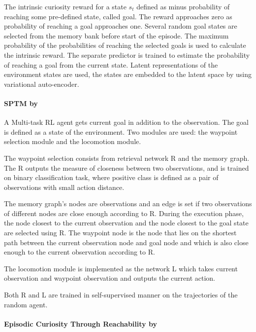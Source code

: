 \documentclass[acmsmall, nonacm]{acmart}
\begin{document}
The intrinsic curiosity reward for a state $s_t$ defined as minus probability of reaching some pre-defined state, called goal. The reward approaches zero as probability of reaching a goal approaches one. Several random goal states are selected from the memory bank before start of the episode. The maximum probability of the probabilities of reaching the selected goals is used to calculate the intrinsic reward. The separate predictor is trained to estimate the probability of reaching a goal from the current state. Latent representations of the environment states are used, the states are embedded to the latent space by using variational auto-encoder.


\paragraph{SPTM by~\citet{savinov2018semiparametric}} %
\label{par:sptm}

A Multi-task RL agent gets current goal in addition to the observation. The goal is defined as a state of the environment. Two modules are used: the waypoint selection module and the locomotion module.

The waypoint selection consists from retrieval network R and the memory graph. The R outputs the measure of closeness between two observations, and is trained on binary classification task, where positive class is defined as a pair of observations with small action distance.

The memory graph's nodes are observations and an edge is set if two observations of different nodes are close enough according to R. During the execution phase, the node closest to the current observation and the node closest to the goal state are selected using R. The waypoint node is the node that lies on the shortest path between the current observation node and goal node and which is also close enough to the current observation according to R.

The locomotion module is implemented as the network L which takes current observation and waypoint observation and outputs the current action.

Both R and L are trained in self-supervised manner on the trajectories of the random agent.


\paragraph{Episodic Curiosity Through Reachability by \citet{savinov2018episodic}}
\end{document}
